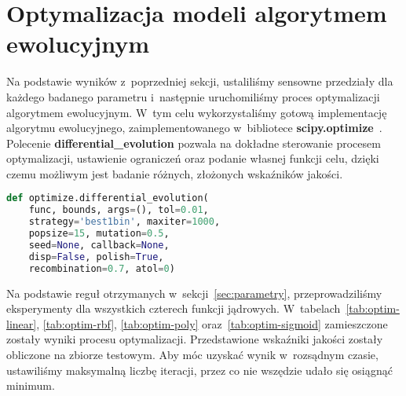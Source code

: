 \section{Optymalizacja modeli algorytmem ewolucyjnym}
\label{sec:optymalizacja}

Na podstawie wyników z~poprzedniej sekcji, ustaliliśmy sensowne przedziały dla każdego badanego parametru i~następnie uruchomiliśmy proces optymalizacji algorytmem ewolucyjnym. W~tym celu wykorzystaliśmy gotową implementację algorytmu ewolucyjnego, zaimplementowanego w~bibliotece \textbf{scipy.optimize}~\cite{scipy}. Polecenie \textbf{differential\_{}evolution} pozwala na dokładne sterowanie procesem optymalizacji, ustawienie ograniczeń oraz podanie własnej funkcji celu, dzięki czemu możliwym jest badanie różnych, złożonych wskaźników jakości. 

\begin{lstlisting}[language=Python, captionpos=b, caption=Nagłówek funkcji \texttt{differential\_{}evolution}]
def optimize.differential_evolution(
    func, bounds, args=(), tol=0.01, 
    strategy='best1bin', maxiter=1000, 
    popsize=15, mutation=0.5, 
    seed=None, callback=None, 
    disp=False, polish=True, 
    recombination=0.7, atol=0)
\end{lstlisting}

Na podstawie reguł otrzymanych w~sekcji~\ref{sec:parametry}, przeprowadziliśmy eksperymenty dla wszystkich czterech funkcji jądrowych. W~tabelach~\ref{tab:optim-linear}, \ref{tab:optim-rbf}, \ref{tab:optim-poly} oraz~\ref{tab:optim-sigmoid} zamieszczone zostały wyniki procesu optymalizacji. Przedstawione wskaźniki jakości zostały obliczone na zbiorze testowym. Aby móc uzyskać wynik w~rozsądnym czasie, ustawiliśmy maksymalną liczbę iteracji, przez co nie wszędzie udało się osiągnąć minimum.

\begin{table}[htb]
    \centering
    \caption{Wyniki procesu optymalizacji wskaźników jakości za pomocą algorytmu ewolucyjnego dla liniowej funkcji jądrowej}
    \label{tab:optim-linear}
\end{table}

